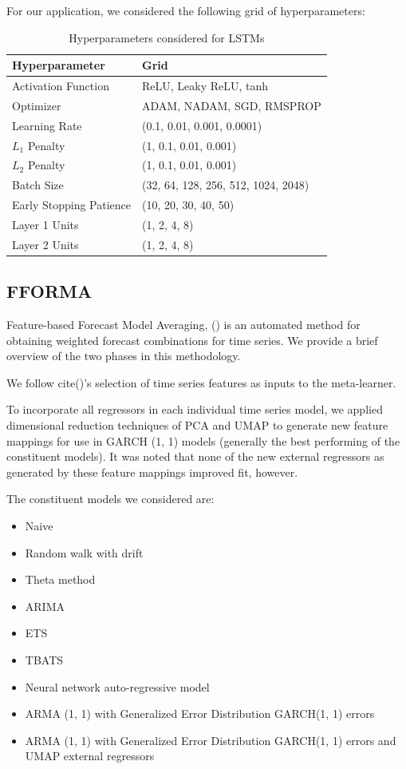 \documentclass{article}
\begin{document}
For our application, we considered the following grid of hyperparameters:
\begin{table}[!htb]
	\begin{tabular}{|ll|}
		\hline
		Hyperparameter & Grid \\ \hline
		Activation Function & ReLU, Leaky ReLU, tanh \\
		Optimizer & ADAM, NADAM, SGD, RMSPROP \\
		Learning Rate & (0.1, 0.01, 0.001, 0.0001) \\
		$L_1$ Penalty & (1, 0.1, 0.01, 0.001) \\
		$L_2$ Penalty & (1, 0.1, 0.01, 0.001) \\
		Batch Size & (32, 64, 128, 256, 512, 1024, 2048) \\
		Early Stopping Patience & (10, 20, 30, 40, 50) \\ 
		Layer 1 Units & (1, 2, 4, 8) \\
		Layer 2 Units & (1, 2, 4, 8) \\ \hline
	\end{tabular}
	\caption{Hyperparameters considered for LSTMs}
\end{table}

\FloatBarrier
\subsection{FFORMA}
Feature-based Forecast Model Averaging, (\cite{montero-manso_fforma_2020}) is an automated method for obtaining weighted forecast combinations for time series. We provide a brief overview of the two phases in this methodology.

We follow cite()'s selection of time series features as inputs to the meta-learner. 

To incorporate all regressors in each individual time series model, we applied dimensional reduction techniques of PCA and UMAP to generate new feature mappings for use in GARCH (1, 1) models (generally the best performing of the constituent models). It was noted that none of the new external regressors as generated by these feature mappings improved fit, however.

The constituent models we considered are:
\begin{itemize}
	\item Naive
	\item Random walk with drift
	\item Theta method
	\item ARIMA
	\item ETS
	\item TBATS
	\item Neural network auto-regressive model
	\item ARMA (1, 1) with Generalized Error Distribution GARCH(1, 1) errors
	\item ARMA (1, 1) with Generalized Error Distribution GARCH(1, 1) errors and UMAP external regressors
\end{itemize}
\end{document}
